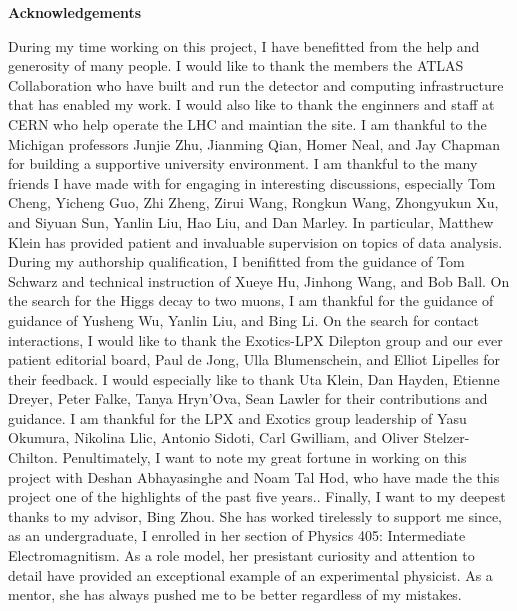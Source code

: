 \begin{center}
\textbf{\LARGE Acknowledgements}
\end{center} 

During my time working on this project, I have benefitted from the help and generosity of many people.
I would like to thank the members the ATLAS Collaboration who have built and run the detector and computing infrastructure that has enabled my work.
I would also like to thank the enginners and staff at CERN who help operate the LHC and maintian the site.
I am thankful to the Michigan professors Junjie Zhu, Jianming Qian, Homer Neal, and Jay Chapman for building a supportive university environment.
I am thankful to the many friends I have made with for engaging in interesting discussions, especially Tom Cheng, Yicheng Guo, Zhi Zheng, Zirui Wang, Rongkun Wang, Zhongyukun Xu, and Siyuan Sun, Yanlin Liu, Hao Liu, and Dan Marley.
In particular, Matthew Klein has provided patient and invaluable supervision on topics of data analysis.
During my authorship qualification, I benifitted from the guidance of Tom Schwarz and technical instruction of Xueye Hu, Jinhong Wang, and Bob Ball.
On the search for the Higgs decay to two muons, I am thankful for the guidance of guidance of Yusheng Wu, Yanlin Liu, and Bing Li.
On the search for contact interactions, I would like to thank the Exotics-LPX Dilepton group and our ever patient editorial board, Paul de Jong, Ulla Blumenschein, and Elliot Lipelles for their feedback.
I would especially like to thank Uta Klein, Dan Hayden, Etienne Dreyer, Peter Falke, Tanya Hryn'Ova, Sean Lawler for their contributions and guidance.
I am thankful for the LPX and Exotics group leadership of Yasu Okumura, Nikolina Llic, Antonio Sidoti, Carl Gwilliam, and Oliver Stelzer-Chilton.
Penultimately, I want to note my great fortune in working on this project with Deshan Abhayasinghe and Noam Tal Hod, who have made the this project one of the highlights of the past five years..
Finally, I want to my deepest thanks to my advisor, Bing Zhou.
She has worked tirelessly to support me since, as an undergraduate, I enrolled in her section of Physics 405: Intermediate Electromagnitism.
As a role model, her presistant curiosity and attention to detail have provided an exceptional example of an experimental physicist. 
As a mentor, she has always pushed me to be better regardless of my mistakes. 


